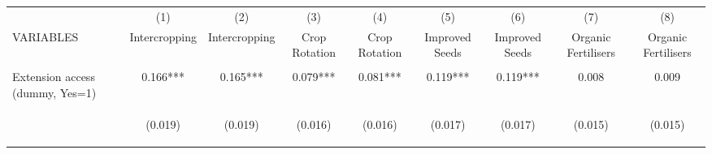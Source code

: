 \begin{center}
\begin{tabular}{lcccccccc} \hline
 & (1) & (2) & (3) & (4) & (5) & (6) & (7) & (8) \\
VARIABLES & Intercropping & Intercropping & Crop Rotation & Crop Rotation & Improved Seeds & Improved Seeds & Organic Fertilisers & Organic Fertilisers \\ \hline
\vspace{4pt} & \begin{footnotesize}\end{footnotesize} & \begin{footnotesize}\end{footnotesize} & \begin{footnotesize}\end{footnotesize} & \begin{footnotesize}\end{footnotesize} & \begin{footnotesize}\end{footnotesize} & \begin{footnotesize}\end{footnotesize} & \begin{footnotesize}\end{footnotesize} & \begin{footnotesize}\end{footnotesize} \\
Extension access (dummy, Yes=1) & 0.166*** & 0.165*** & 0.079*** & 0.081*** & 0.119*** & 0.119*** & 0.008 & 0.009 \\
\vspace{4pt} & \begin{footnotesize}(0.019)\end{footnotesize} & \begin{footnotesize}(0.019)\end{footnotesize} & \begin{footnotesize}(0.016)\end{footnotesize} & \begin{footnotesize}(0.016)\end{footnotesize} & \begin{footnotesize}(0.017)\end{footnotesize} & \begin{footnotesize}(0.017)\end{footnotesize} & \begin{footnotesize}(0.015)\end{footnotesize} & \begin{footnotesize}(0.015)\end{footnotesize} \\

\end{tabular}
\end{center}
